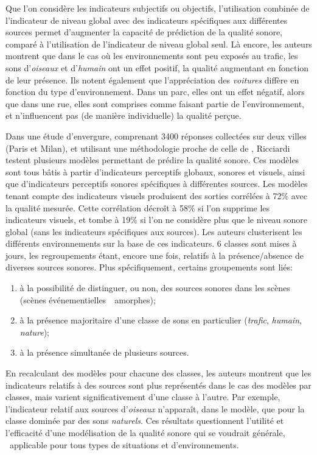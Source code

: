 Que l'on considère les indicateurs subjectifs ou objectifs, l'utilisation combinée de l'indicateur de niveau global avec des indicateurs spécifiques aux différentes sources permet d'augmenter la capacité de prédiction de la qualité sonore, comparé à l'utilisation de l'indicateur de niveau global seul. Là encore, les auteurs montrent que dans le cas où les environnements sont peu exposés au trafic, les sons d'\emph{oiseaux} et d'\emph{humain} ont un effet positif, la qualité augmentant en fonction de leur présence. Ils notent également que l'appréciation des \emph{voitures} diffère en fonction du type d'environnement. Dans un parc, elles ont un effet négatif, alors que dans une rue, elles sont comprises comme faisant partie de l'environnement, et n'influencent pas (de manière individuelle) la qualité perçue.

Dans une étude d'envergure, comprenant 3400 réponses collectées sur deux villes (Paris et Milan), et utilisant une méthodologie proche de celle de \citep{lavandier2006contribution}, Ricciardi~\al \citep{ricciardi2015sound} testent plusieurs modèles permettant de prédire la qualité sonore. Ces modèles sont tous bâtis à partir d'indicateurs perceptifs globaux, sonores et visuels, ainsi que d'indicateurs perceptifs sonores spécifiques à différentes sources. Les modèles tenant compte des indicateurs visuels produisent des sorties corrélées à 72\% avec la qualité mesurée. Cette corrélation décroît à 58\% si l'on supprime les indicateurs visuels, et tombe à 19\% si l'on ne considère plus que le niveau sonore global (sans les indicateurs spécifiques aux sources). Les auteurs clusterisent les différents environnements sur la base de ces indicateurs. 6 classes sont mises à jours, les regroupements étant, encore une fois, relatifs à la présence/absence de diverses sources sonores. Plus spécifiquement, certains groupements sont liés:

\begin{enumerate}
\item à la possibilité de distinguer, ou non, des sources sonores dans les scènes (scènes événementielles~\vs~amorphes);
\item à la présence majoritaire d'une classe de sons en particulier (\emph{trafic}, \emph{humain}, \emph{nature});
\item à la présence simultanée de plusieurs sources.
\end{enumerate}

En recalculant des modèles pour chacune des classes, les auteurs montrent que les indicateurs relatifs à des sources sont plus représentés dans le cas des modèles par classes, mais varient significativement d'une classe à l'autre. Par exemple, l’indicateur relatif aux sources d'\emph{oiseaux} n'apparaît, dans le modèle, que pour la classe dominée par des sons \emph{naturels}. Ces résultats questionnent l'utilité et l'efficacité d'une modélisation de la qualité sonore qui se voudrait générale, \ie~applicable pour tous types de situations et d'environnements.

